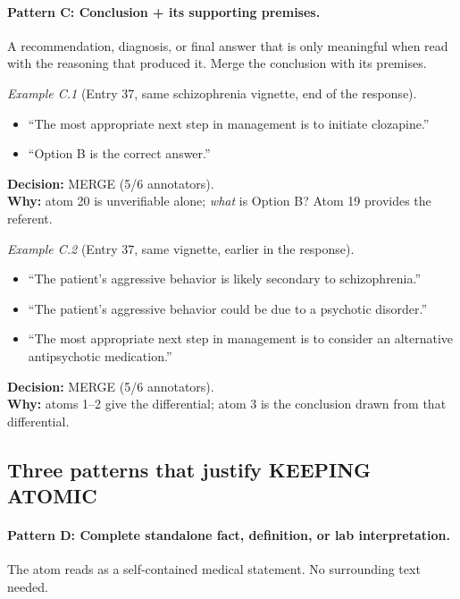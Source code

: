 \documentclass{article}
\begin{document}
\paragraph{Pattern C: Conclusion + its supporting premises.}
A recommendation, diagnosis, or final answer that is only meaningful when read with the reasoning that produced it. Merge the conclusion with its premises.

\medskip
\noindent\textit{Example C.1} (Entry 37, same schizophrenia vignette, end of the response).
\begin{itemize}[leftmargin=1.8em,labelsep=0.5em,itemsep=2pt,topsep=3pt]
    \item[\textit{atom 19:}] ``The most appropriate next step in management is to initiate clozapine.''
    \item[\textit{atom 20:}] ``Option B is the correct answer.''
\end{itemize}
\noindent\textbf{Decision:} MERGE (5/6 annotators). \\
\noindent\textbf{Why:} atom 20 is unverifiable alone; \textit{what} is Option B? Atom 19 provides the referent.

\medskip
\noindent\textit{Example C.2} (Entry 37, same vignette, earlier in the response).
\begin{itemize}[leftmargin=1.8em,labelsep=0.5em,itemsep=2pt,topsep=3pt]
    \item[\textit{atom 1:}] ``The patient's aggressive behavior is likely secondary to schizophrenia.''
    \item[\textit{atom 2:}] ``The patient's aggressive behavior could be due to a psychotic disorder.''
    \item[\textit{atom 3:}] ``The most appropriate next step in management is to consider an alternative antipsychotic medication.''
\end{itemize}
\noindent\textbf{Decision:} MERGE (5/6 annotators). \\
\noindent\textbf{Why:} atoms 1--2 give the differential; atom 3 is the conclusion drawn from that differential.

\subsection{Three patterns that justify KEEPING ATOMIC}
\label{sec:atomic-patterns}

\paragraph{Pattern D: Complete standalone fact, definition, or lab interpretation.}
The atom reads as a self-contained medical statement. No surrounding text needed.
\end{document}
